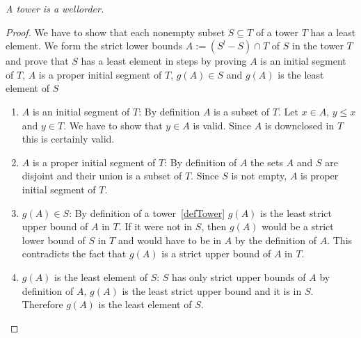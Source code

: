 \begin{lemma}
    \label{thmTowerWellorder}
    \emph{A tower is a wellorder.}

    \begin{proof}
        We have to show that each nonempty subset $S \subseteq T$ of a tower $T$
        has a least element. We form the strict lower bounds $A := (S^l - S)
        \cap T$ of $S$ in the tower $T$ and prove that $S$ has a least element
        in steps by proving
            $A$ is an initial segment of $T$,
            $A$ is a proper initial segment of $T$,
            $g(A) \in S$
            and
            $g(A)$ is the least element of $S$


        \begin{enumerate}
            \item $A$ is an initial segment of $T$: By definition $A$ is a
                subset of $T$. Let $x \in A$, $y \le x$ and $y \in T$. We have
                to show that $y \in A$ is valid. Since $A$ is downclosed in $T$
                this is certainly valid.

            \item $A$ is a proper initial segment of $T$: By definition of $A$
                the sets $A$ and $S$ are disjoint and their union is a subset of
                $T$.  Since $S$ is not empty, $A$ is proper initial segment of
                $T$.

            \item $g(A) \in S$:
            By definition of  a tower~\ref{defTower}
            $g(A)$ is the least strict upper bound of $A$ in $T$. If it were not in
            $S$, then $g(A)$ would be a strict lower bound of $S$ in $T$ and would
            have to be in $A$ by the definition of $A$. This contradicts the fact
            that $g(A)$ is a strict upper bound of $A$ in $T$.

            \item $g(A)$ is the least element of $S$:
            $S$ has only strict upper bounds of $A$ by definition of $A$, $g(A)$ is
            the least strict upper bound and it is in $S$. Therefore $g(A)$ is the
            least element of $S$.
        \end{enumerate}
    \end{proof}
\end{lemma}



